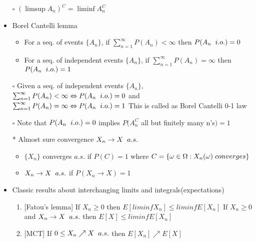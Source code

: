 \documentclass[12pt, A4]{article}
\begin{document}
\begin{itemize}
	\item[$\square$] $(\limsup A_n)^{C}=\liminf A_n^{C}$
	\item Borel Cantelli lemma
	\begin{itemize}
		\item For a seq. of events $\{A_n\}$, if $\sum_{n=1}^{\infty}P(A_n)<\infty$ then $P(A_n\hspace{0.2cm} i.o.)=0$
		\item For a seq. of independent events $\{A_n\}$, if $\sum_{n=1}^{\infty} P(A_n)=\infty$ then $P(A_n\hspace{0.2cm} i.o.)=1$
	\end{itemize}
	\item[$\square$] Given a seq. of independent events $\{A_n\}$, \newline
	$\sum_{n=1}^{\infty}P(A_n)<\infty \Leftrightarrow P(A_n\hspace{0.2cm} i.o.)=0$
	\quad and \quad $\sum_{n=1}^{\infty} P(A_n)=\infty \Leftrightarrow P(A_n\hspace{0.2cm} i.o.)=1$
	\newline This is called as Borel Cantelli 0-1 law
	\item[$\square$] Note that $P(A_n\hspace{0.2cm} i.o.)=0$ implies $P(A_n^{C}$ all but finitely many n's$)=1$
	\item[*] Almost sure convergence $X_n \rightarrow X \hspace{0.2cm} a.s.$
	\begin{itemize}
		\item $\{X_n\}$ converges \hspace{0.1cm}$a.s.$ if $P(C)=1$ where $C=\{\omega\in\Omega : X_n(\omega)\hspace{0.1cm} converges\}$
		\item $X_n \rightarrow X \hspace{0.2cm} a.s.$ if $P(X_n\rightarrow X)=1$
	\end{itemize}
	\item Classic results about interchanging limits and integrals(expectations)
	\begin{enumerate}
		\item {[Fatou's lemma]} If $X_n \geq 0 $ then $E[liminfX_n]\leq liminfE[X_n]$
		\newline If $X_n \geq 0$ and $X_n \rightarrow X \hspace{0.2cm} a.s.$ then $E[X]\leq liminfE[X_n]$
		\item {[MCT]} If $0\leq X_n \nearrow X \hspace{0.2cm} a.s.$ then $E[X_n]\nearrow E[X]$

\end{enumerate}
\end{itemize}
\end{document}
